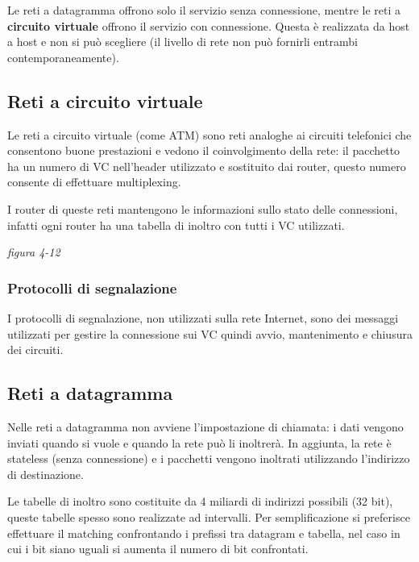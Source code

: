 \documentclass[
]{article}
\begin{document}
Le reti a datagramma offrono solo il servizio senza connessione, mentre
le reti a \textbf{circuito virtuale} offrono il servizio con
connessione. Questa è realizzata da host a host e non si può scegliere
(il livello di rete non può fornirli entrambi contemporaneamente).

\hypertarget{header-n17}{%
\subsection{Reti a circuito virtuale}\label{header-n17}}

Le reti a circuito virtuale (come ATM) sono reti analoghe ai circuiti
telefonici che consentono buone prestazioni e vedono il coinvolgimento
della rete: il pacchetto ha un numero di VC nell'header utilizzato e
sostituito dai router, questo numero consente di effettuare
multiplexing.

I router di queste reti mantengono le informazioni sullo stato delle
connessioni, infatti ogni router ha una tabella di inoltro con tutti i
VC utilizzati.

\emph{figura 4-12}

\hypertarget{header-n21}{%
\subsubsection{Protocolli di segnalazione}\label{header-n21}}

I protocolli di segnalazione, non utilizzati sulla rete Internet, sono
dei messaggi utilizzati per gestire la connessione sui VC quindi avvio,
mantenimento e chiusura dei circuiti.

\hypertarget{header-n23}{%
\subsection{Reti a datagramma}\label{header-n23}}

Nelle reti a datagramma non avviene l'impostazione di chiamata: i dati
vengono inviati quando si vuole e quando la rete può li inoltrerà. In
aggiunta, la rete è stateless (senza connessione) e i pacchetti vengono
inoltrati utilizzando l'indirizzo di destinazione.

Le tabelle di inoltro sono costituite da 4 miliardi di indirizzi
possibili (32 bit), queste tabelle spesso sono realizzate ad intervalli.
Per semplificazione si preferisce effettuare il matching confrontando i
prefissi tra datagram e tabella, nel caso in cui i bit siano uguali si
aumenta il numero di bit confrontati.
\end{document}
